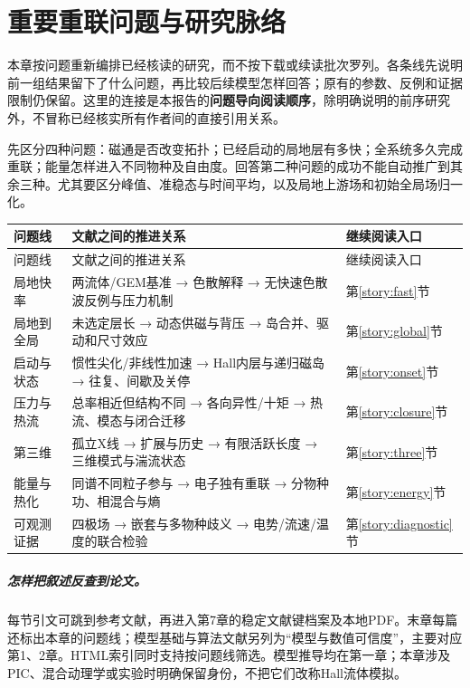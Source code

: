 \chapter{重要重联问题与研究脉络}\label{ch:findings}
\label{sec:remaining-findings}
本章按问题重新编排已经核读的研究，而不按下载或续读批次罗列。各条线先说明前一组结果留下了什么问题，再比较后续模型怎样回答；原有的参数、反例和证据限制仍保留。这里的连接是本报告的\textbf{问题导向阅读顺序}，除明确说明的前序研究外，不冒称已经核实所有作者间的直接引用关系。

先区分四种问题：磁通是否改变拓扑；已经启动的局地层有多快；全系统多久完成重联；能量怎样进入不同物种及自由度。回答第二种问题的成功不能自动推广到其余三种。尤其要区分峰值、准稳态与时间平均，以及局地上游场和初始全局场归一化。

\begin{longtable}{P{24mm}P{85mm}P{38mm}}
\toprule 问题线 & 文献之间的推进关系 & 继续阅读入口\\\midrule\endfirsthead
\toprule 问题线 & 文献之间的推进关系 & 继续阅读入口\\\midrule\endhead
局地快率 & 两流体/GEM基准 → 色散解释 → 无快速色散波反例与压力机制 & 第\ref{story:fast}节\\
局地到全局 & 未选定层长 → 动态供磁与背压 → 岛合并、驱动和尺寸效应 & 第\ref{story:global}节\\
启动与状态 & 惯性尖化/非线性加速 → Hall内层与递归磁岛 → 往复、间歇及关停 & 第\ref{story:onset}节\\
压力与热流 & 总率相近但结构不同 → 各向异性/十矩 → 热流、模态与闭合迁移 & 第\ref{story:closure}节\\
第三维 & 孤立X线 → 扩展与历史 → 有限活跃长度 → 三维模式与湍流状态 & 第\ref{story:three}节\\
能量与热化 & 同谱不同粒子参与 → 电子独有重联 → 分物种功、相混合与熵 & 第\ref{story:energy}节\\
可观测证据 & 四极场 → 嵌套与多物种歧义 → 电势/流速/温度的联合检验 & 第\ref{story:diagnostic}节\\
\bottomrule
\end{longtable}

\paragraph{怎样把叙述反查到论文。}
每节引文可跳到参考文献，再进入第7章的稳定文献键档案及本地PDF。末章每篇还标出本章的问题线；模型基础与算法文献另列为“模型与数值可信度”，主要对应第1、2章。HTML索引同时支持按问题线筛选。模型推导均在第一章；本章涉及PIC、混合动理学或实验时明确保留身份，不把它们改称Hall流体模拟。









